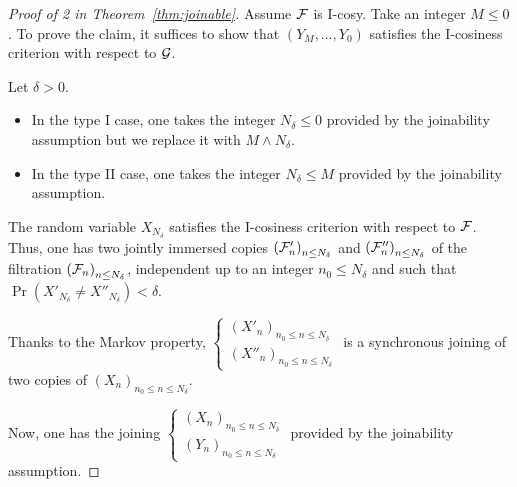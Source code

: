 \documentclass[12pt,a4paper]{article}
\begin{document}
\begin{proof}[Proof of 2 in Theorem~\ref{thm:joinable}]

Assume $\mathcal{F}$ is I-cosy. Take an integer $M \leq 0$. 
To prove the claim, it suffices to show that $(Y_M, \ldots, Y_0)$ 
satisfies the I-cosiness criterion with respect to $\mathcal{G}$. 

Let $\delta>0$. 
\begin{itemize}
\item In the type I case, one takes the integer $N_\delta \leq 0$ provided by the 
joinability assumption but we replace it with $M \wedge N_\delta$. 

\item In the type II case, one takes the integer $N_\delta \leq M$ provided by the 
joinability assumption. 
\end{itemize}

The random variable $X_{N_\delta}$ satisfies the I-cosiness criterion 
with respect to $\mathcal{F}$. Thus, one has two jointly immersed copies 
${(\mathcal{F}'_n)}_{n \leq N_\delta}$ and ${(\mathcal{F}''_n)}_{n \leq N_\delta}$ 
of the filtration ${(\mathcal{F}_n)}_{n \leq N_\delta}$, independent up to 
an integer $n_0 \leq N_\delta$ and  
 such that $\Pr(X'_{N_\delta} \neq X''_{N_\delta}) < \delta$. 



Thanks to the Markov property,  
$\left\{\begin{smallmatrix} {(X'_n)}_{n_0 \leq n \leq N_\delta} \\ 
{(X''_n)}_{n_0 \leq n \leq N_\delta}
\end{smallmatrix}\right.$ 
is a synchronous joining 
of two copies of ${(X_n)}_{n_0 \leq n \leq N_\delta}$. 

Now, one has the joining 
 $\left\{\begin{smallmatrix} {(X_n)}_{n_0 \leq n \leq N_\delta} \\ 
{(Y_n)}_{n_0 \leq n \leq N_\delta}
\end{smallmatrix}\right.$ provided by the joinability assumption. 



\end{proof}
\end{document}
